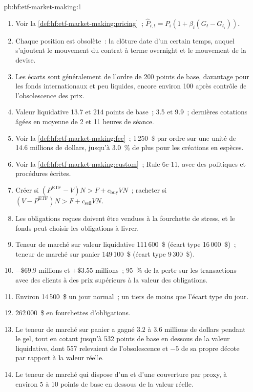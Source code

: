 \begin{solution}{pb:hf:etf-market-making:1}
\begin{enumerate}
\item Voir la \cref{def:hf:etf-market-making:pricing}~; $\hat P_{i,t}=P_i(1+\beta_i(G_t-G_{t_i}))$.
\item Chaque position est obsolète~: la clôture date d'un certain temps, auquel s'ajoutent le mouvement du contrat à terme overnight et le mouvement de la devise.
\item Les écarts sont généralement de l'ordre de 200 points de base, davantage pour les fonds internationaux et peu liquides,
encore environ 100 après contrôle de l'obsolescence des prix.
\item Valeur liquidative 13.7 et 214 points de base~;  3.5 et 9.9~; dernières cotations âgées en moyenne de 2 et 11 heures de séance.
\item Voir la \cref{def:hf:etf-market-making:fee}~; 1\,250~\$ par ordre sur une unité de 14.6 millions de dollars, jusqu'à 3.0~\% de plus pour les créations en espèces.
\item Voir la \cref{def:hf:etf-market-making:custom}~; Rule 6c-11, avec des politiques et procédures écrites.
\item Créer si $(P^{\mathrm{ETF}}-V)N>F+c_{\mathrm{buy}}VN$~; racheter si $(V-P^{\mathrm{ETF}})N>F+c_{\mathrm{sell}}VN$.
\item Les obligations reçues doivent être vendues à la fourchette de stress, et le fonds peut choisir les obligations à livrer.
\item Teneur de marché sur valeur liquidative 111\,600~\$ (écart type 16\,000~\$)~; teneur de marché sur panier 149\,100~\$ (écart type 9\,300~\$).
\item $-\$69.9$ millions et $+\$3.55$ millions~; 95~\% de la perte sur les transactions avec des clients à des prix supérieurs à la valeur des obligations.
\item Environ 14\,500~\$ un jour normal~; un tiers de moins que l'écart type du jour.
\item 262\,000~\$ en fourchettes d'obligations.
\item Le teneur de marché sur panier a gagné 3.2 à 3.6 millions de dollars pendant le gel, tout en cotant jusqu'à 532 points de base en dessous
de la valeur liquidative, dont 557 relevaient de l'obsolescence et $-5$ de sa propre décote par rapport à la valeur réelle.
\item Le teneur de marché qui dispose d'un  et d'une couverture par proxy, à environ 5 à 10 points de base en dessous de la valeur réelle.

\end{enumerate}
\end{solution}
